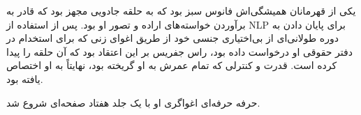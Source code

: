 یکی از قهرمانان همیشگی‌اش فانوس سبز بود که به حلقه جادویی مجهز بود که قادر به برآوردن خواسته‌های اراده و تصور او بود. پس از استفاده از NLP برای پایان دادن به دوره طولانی‌ای از بی‌اختیاری جنسی خود از طریق اغوای زنی که برای استخدام در دفتر حقوقی او درخواست داده بود، راس جفریس بر این اعتقاد بود که آن حلقه را پیدا کرده است. قدرت و کنترلی که تمام عمرش به او گریخته بود، نهایتاً به او اختصاص یافته بود.

حرفه حرفه‌ای اغواگری او با یک جلد هفتاد صفحه‌ای شروع شد.